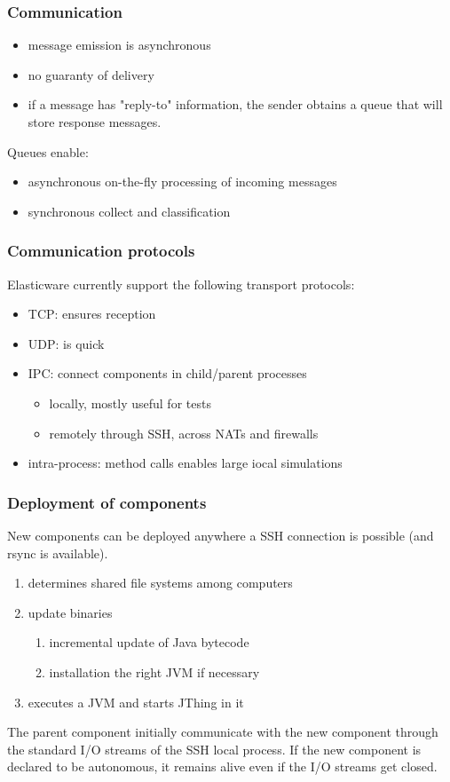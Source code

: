 \documentclass[11pt]{beamer}
\begin{document}
\begin{frame}
\frametitle{Communication}
\begin{itemize}
	\item message emission is asynchronous
	\item no guaranty of delivery
	\item if a message has "reply-to" information, the sender obtains a queue that will store response messages.
\end{itemize}
Queues enable:
\begin{itemize}
	\item asynchronous on-the-fly  processing of incoming messages
	\item synchronous collect and classification
\end{itemize}
\end{frame}


\begin{frame}
\frametitle{Communication protocols}
Elasticware currently support the following transport protocols:
\begin{itemize}
	\item TCP: ensures reception
	\item UDP: is quick
	\item IPC: connect components in child/parent processes
		\begin{itemize}
			\item locally, mostly useful for tests
			\item remotely through SSH, across NATs and firewalls
		\end{itemize}
	\item intra-process: method calls enables large iocal simulations
\end{itemize}
\end{frame}


\begin{frame}
\frametitle{Deployment of components}
New components can be deployed anywhere a SSH connection is possible (and rsync is available).
\begin{enumerate}
	\item determines shared file systems among computers
	\item update binaries
		\begin{enumerate}
			\item incremental update of Java  bytecode
			\item installation the right JVM if necessary
		\end{enumerate}
	\item executes a JVM  and starts JThing in it
\end{enumerate}
The parent component initially communicate with the new component through the standard I/O streams of the SSH local process. If the new component is declared to be autonomous, it remains alive even if the I/O streams get closed.
\end{frame}
\end{document}
